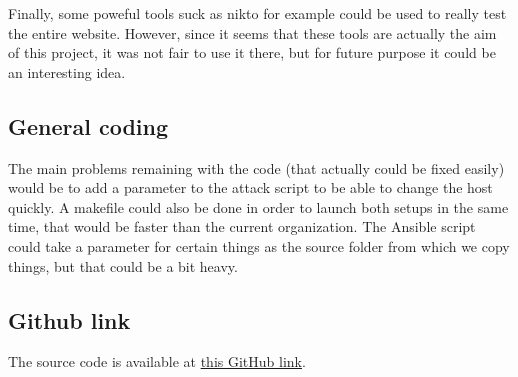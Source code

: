 \documentclass[a4paper,12pt,fleqn]{article}
\begin{document}
Finally, some poweful tools suck as nikto for example could be used to really test the entire website. However, since it seems that these tools are actually the aim of this project, it was not fair to use it there, but for future purpose it could be an interesting idea.

\subsection{General coding}

The main problems remaining with the code (that actually could be fixed easily) would be to add a parameter to the attack script to be able to change the host quickly. A makefile could also be done in order to launch both setups in the same time, that would be faster than the current organization. The Ansible script could take a parameter for certain things as the source folder from which we copy things, but that could be a bit heavy.






\newpage
\begin{appendices}

\newpage
\section{Github link}
\label{app:a}
The source code is available at \href{https://github.com/JoannVetter/Attack-defense-automation}{this GitHub link}.
\end{appendices}
\end{document}
